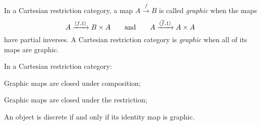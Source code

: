     In a Cartesian restriction category, a map $A\xrightarrow{f}B$ is
    called \emph{graphic} when the maps
    \[
      A\xrightarrow{\langle f,1\rangle}B\times A\qquad \text{and}\qquad
      A\xrightarrow{\langle\overline{f},1\rangle}A\times A
    \]
    have partial inverses. A Cartesian restriction category is \emph{graphic} when all of its maps
    are graphic.
    \begin{lemma}\label{lem:graphic_maps_are_closed_in_a_cartesian_restriction_category}
      In a Cartesian restriction category:
      \bproofenum
        \item Graphic maps are closed under composition;
        \item Graphic maps are closed under the restriction;
        \item An object is discrete if and only if its identity map is graphic.
      \eproofenum
    \end{lemma}
